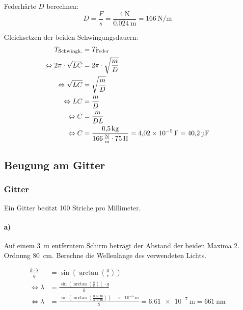 \documentclass{ajc}
\begin{document}
	Federhärte $D$ berechnen:
	\begin{equation}
		D = \frac{F}{s} = \frac{\SI{4}{\newton}}{\SI{0,024}{\m}} = \SI{166}{\newton\per\meter}
	\end{equation}
	
	Gleichsetzen der beiden Schwingungsdauern:
	\begin{equation}
		\begin{split}
			T_\text{Schwingk.} &= T_\text{Feder}\\
			\Leftrightarrow 2\pi \cdot \sqrt{LC} &= 2\pi \cdot \sqrt{\frac{m}{D}} \\
			\Leftrightarrow \sqrt{LC} &= \sqrt{\frac{m}{D}} \\
			\Leftrightarrow LC &= \frac{m}{D} \\
			\Leftrightarrow C &= \frac{m}{DL} \\
			\Leftrightarrow C &= \frac{\SI{0,5}{\kilogram}}{\SI{166}{\newton\per\meter} \cdot \SI{75}{\H}} = \SI{4,02e-5}{\farad} = \SI{40,2}{\micro\farad}
		\end{split}
	\end{equation}
	
	\newpage
	
	\subsection{Beugung am Gitter}
	
	\subsubsection{Gitter}
	Ein Gitter besitzt 100 Striche pro Millimeter.
	
	\paragraph{a)} Auf einem \SI{3}{\meter} entferntem Schirm beträgt der Abstand der beiden Maxima 2. Ordnung \SI{80}{\centi\meter}. Berechne die Wellenlänge des verwendeten Lichts.
	
	\begin{equation}
		\begin{split}
			\frac{k \cdot \lambda}{g} &= \sin\left(\arctan\left(\frac{a}{e}\right)\right) \\
			\Leftrightarrow \lambda &= \frac{\sin\left(\arctan\left(\frac{a}{e}\right)\right) \cdot g}{k} \\
			\Leftrightarrow \lambda &= \frac{\sin\left(\arctan\left(\frac{\SI{0,40}{\meter}}{\SI{3,00}{\meter}}\right)\right) \cdot \SI{e-5}{\meter}}{2} = \SI{6,61e-7}{\meter} = \SI{661}{\nm}
		\end{split}
	\end{equation}
	
\end{document}
